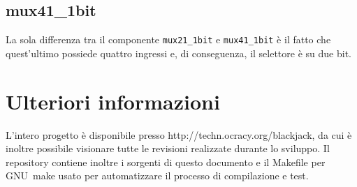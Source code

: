 \documentclass [11pt,a4paper,oneside]{article}
\newcommand{\component}[1]{\texttt{#1}}
\begin{document}


\subsection{mux41\_1bit}

La sola differenza tra il componente  \component{mux21\_1bit} e
\component{mux41\_1bit} è il fatto che quest'ultimo possiede quattro ingressi e,
di conseguenza, il selettore è su due bit.



\section{Ulteriori informazioni}
L'intero progetto è disponibile presso http://techn.ocracy.org/blackjack, da cui
è inoltre possibile visionare tutte le revisioni realizzate durante lo sviluppo.
Il repository contiene inoltre i sorgenti di questo documento e il Makefile
per GNU~make usato per automatizzare il processo di compilazione e test.
\end{document}
